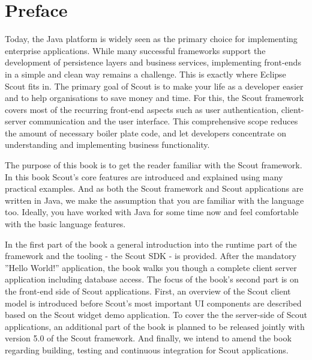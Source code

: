 \documentclass[a4paper,10pt,twoside]{book}
\begin{document}
  \sloppy
\fi


\chapter{Preface}

Today, the Java platform is widely seen as the primary choice for implementing enterprise applications. 
While many successful frameworks support the development of persistence layers and business services, implementing front-ends in a simple and clean way remains a challenge. 
This is exactly where Eclipse Scout fits in. 
The primary goal of Scout is to make your life as a developer easier and to help organisations to save money and time. 
For this, the Scout framework covers most of the recurring front-end aspects such as user authentication, client-server communication and the user interface. 
This comprehensive scope reduces the amount of necessary boiler plate code, and let developers concentrate on understanding and implementing business functionality. 

The purpose of this book is to get the reader familiar with the Scout framework.
In this book Scout's core features are introduced and explained using many practical examples. 
And as both the Scout framework and Scout applications are written in Java, we make the assumption that you are familiar with the language too. 
Ideally, you have worked with Java for some time now and feel comfortable with the basic language features. 

In the first part of the book a general introduction into the runtime part of the framework and the tooling - the Scout SDK - is provided. 
After the mandatory ''Hello World!'' application, the book walks you though a complete client server application including database access. 
The focus of the book's second part is on the front-end side of Scout applications. 
First, an overview of the Scout client model is introduced before Scout's most important UI components are described based on the Scout widget demo application. 
To cover the the server-side of Scout applications, an additional part of the book is planned to be released jointly with version 5.0 of the Scout framework. 
And finally, we intend to amend the book regarding building, testing and continuous integration for Scout applications. 
\end{document}
